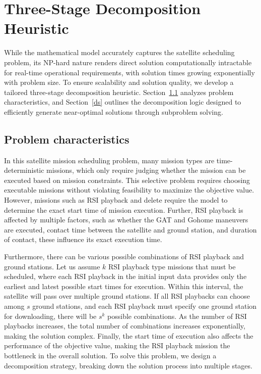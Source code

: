 \documentclass[preprint,3p,12pt,authoryear]{elsarticle}
\begin{document}
\section{Three-Stage Decomposition Heuristic}
While the mathematical model accurately captures the satellite scheduling
  problem, its NP-hard nature renders direct solution computationally intractable
  for real-time operational requirements, with solution times growing exponentially
   with problem size. To ensure scalability and solution quality, we develop a tailored three-stage decomposition heuristic. Section~\ref{pc} analyzes problem characteristics, and Section~\ref{ds} outlines the decomposition logic designed to efficiently generate near-optimal solutions through subproblem solving.

\subsection{Problem characteristics}\label{pc}
In this satellite mission scheduling problem, many mission types are time-deterministic missions, which only require judging whether the mission can be executed based on mission constraints. This selective problem requires choosing executable missions without violating feasibility to maximize the objective value. However, missions such as RSI playback and delete require the model to determine the exact start time of mission execution. Further, RSI playback is affected by multiple factors, such as whether the GAT and Gohome maneuvers are executed, contact time between the satellite and ground station, and duration of contact, these influence its exact execution time. 

Furthermore, there can be various possible combinations of RSI playback and ground stations. Let us assume $k$ RSI playback type missions that must be scheduled, where each RSI playback in the initial input data provides only the earliest and latest possible start times for execution. Within this interval, the satellite will pass over multiple ground stations. If all RSI playbacks can choose among $s$ ground stations, and each RSI playback must specify one ground station for downloading, there will be $s^k$ possible combinations. As the number of RSI playbacks increases, the total number of combinations increases exponentially, making the solution complex. Finally, the start time of execution also affects the performance of the objective value, making the RSI playback mission the bottleneck in the overall solution. To solve this problem, we design a decomposition strategy, breaking down the solution process into multiple stages.
\end{document}
